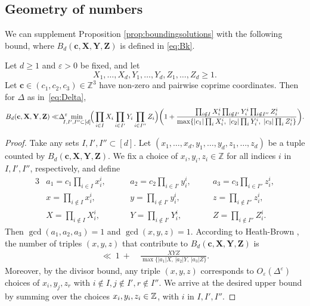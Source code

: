 \subsection{Geometry of numbers}\label{s:geom}


We can supplement Proposition \ref{prop:boundingsolutions} with the following bound,
where  $B_d(\mathbf{c},\mathbf{X},\mathbf{Y},\mathbf{Z})$ is  defined in  \eqref{eq:Bk}.

\begin{proposition} \label{prop:detmethod}
Let $d\geq 1$ and $\varepsilon>0$ be fixed, and let
$$
X_1,\ldots, X_d, Y_1,\ldots, Y_d,Z_1,\ldots, Z_d\geq 1.
$$
Let $\mathbf{c}\in (c_1,c_2,c_3)\in \mathbb{Z}^3$ have non-zero and pairwise coprime coordinates.
Then for $\Delta$ as in~\eqref{eq:Delta},
$$
B_d(\mathbf{c},\mathbf{X},\mathbf{Y},\mathbf{Z})
\ll
\hspace{-0.1cm} \Delta^{\varepsilon}
\hspace{-0.3cm}
\min_{I,I',I''\subset[d]}
\hspace{-0.1cm}
\Big(\prod_{i\in I}X_i\prod_{i\in I'}Y_i\prod_{i\in I''}Z_i\Big)\bigg(1 +
\frac{\prod_{i\notin I}X_i^i\prod_{i\notin I'}Y_i^i\prod_{i\notin I''}Z_i^i}
{\max\{|c_1|\prod_{i}X_i^i,\;|c_2|\prod_{i}Y_i^i,\;|c_3|\prod_{i}Z_i^i\}}\bigg).
$$
\end{proposition}
\begin{proof}
Take any sets $I,I',I''\subset[d]$. Let $(x_1,\ldots, x_d,y_1,\ldots, y_d,z_1,\ldots, z_d)$ be a tuple counted by $B_d(\mathbf{c},\mathbf{X},\mathbf{Y},\mathbf{Z})$. We fix a choice of
$
x_i,y_i,z_i \in \mathbb{Z}
$ for all indices $i$ in $I,I',I''$, respectively, and define
\begin{alignat*}{3}
&a_1=c_1\prod_{i\in I}x_i^i, \quad
&&a_2=c_2\prod_{i\in I'}y_i^i, \quad
&&a_3=c_3\prod_{i\in I''}z_i^i,\\
&x=\prod_{i\notin I}x_i^i, \qquad
&&y=\prod_{i\notin I'}y_i^i, \qquad
&&z=\prod_{i\notin I''}z_i^i,\\
&X=\prod_{i\notin I}X_i^i, \qquad
&&Y=\prod_{i\notin I'}Y_i^i, \qquad
&&Z=\prod_{i\notin I''}Z_i^i.
\end{alignat*}
Then $\gcd(a_1,a_2,a_3)=1$ and $\gcd(x,y,z)=1$. According to Heath-Brown \cite[Lemma 3]{h-b84}, the number of triples $(x,y,z)$ that contribute to $B_d(\mathbf{c},\mathbf{X},\mathbf{Y},\mathbf{Z})$ is
\begin{align*}
\ll \ 1 \ + \ &
\frac{XYZ}{\max\big\{|a_1|X,\,|a_2|Y,\,|a_3|Z\big\}}.
\end{align*}
Moreover, by the divisor bound, any triple $(x,y,z)$ corresponds to $O_{\varepsilon}(\Delta^{\varepsilon})$ choices of $x_i,y_j,z_r$ with $i\not \in I, j\not \in I', r\not \in I''$.
We arrive at the
desired upper bound by
summing over the choices $x_i,y_i,z_i\in\mathbb{Z}$,  with $i$ in $I,I',I''$.
\end{proof}




